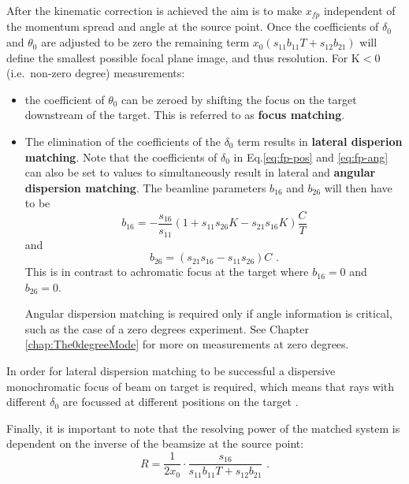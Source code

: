 \documentclass[11pt]{report}
\begin{document}
After the kinematic correction is achieved
the aim is to make $x_{fp}$ independent of the momentum spread and angle at the source point.
Once the coefficients of $\delta_0$ and $\theta_0$ are adjusted to be zero the remaining term 
$x_{0}(s_{11}b_{11}T+s_{12}b_{21})$ will define the smallest possible focal plane
image, and thus resolution. For K$<$0 (i.e.~non-zero degree) measurements:
\begin{itemize}
\item the coefficient of $\theta_0$ can be zeroed by shifting the focus on the target downstream of the target. 
This is referred to as {\bf focus matching}. 
\item The elimination of the coefficients of the $\delta_0$ term results in {\bf lateral disperion matching}. 
Note that the coefficients of $\delta_0$ in Eq.\ref{eq:fp-pos} and \ref{eq:fp-ang} can also be set to values to 
simultaneously result in lateral and {\bf angular dispersion matching}. 
The beamline parameters $b_{16}$ and $b_{26}$ will then have to be
\begin{equation} 
b_{16}=-\frac{s_{16}}{s_{11}}(1+s_{11}s_{26}K-s_{21}s_{16}K)\frac{C}{T} \label{eq:lateral-DM-1} 
\end{equation} 
and
\begin{equation} 
b_{26}=(s_{21}s_{16}-s_{11}s_{26})C \label{eq:lateral-DM-2} \textrm{       .}
\end{equation} 
This is in contrast to achromatic focus at the target where $b_{16}=0$ and $b_{26}=0$.

Angular dispersion matching is required 
only if angle information is critical, such as the case of a zero degrees experiment. 
See Chapter \ref{chap:The0degreeMode} for more on measurements at zero degrees.


\end{itemize}

In order for lateral dispersion matching to be successful 
a dispersive monochromatic focus of beam on target is required, which means
that rays with different $\delta_0$ are focussed at different positions on the target \cite{Fuj02}. %


Finally, it is important to note that the resolving power of the matched system is dependent on the inverse of the beamsize at the source point:
\begin{equation}
R=\frac{1}{2x_0}\cdot \frac{s_{16}} {s_{11}b_{11}T+s_{12}b_{21} }  \textrm{      .}
\end{equation}
\end{document}
